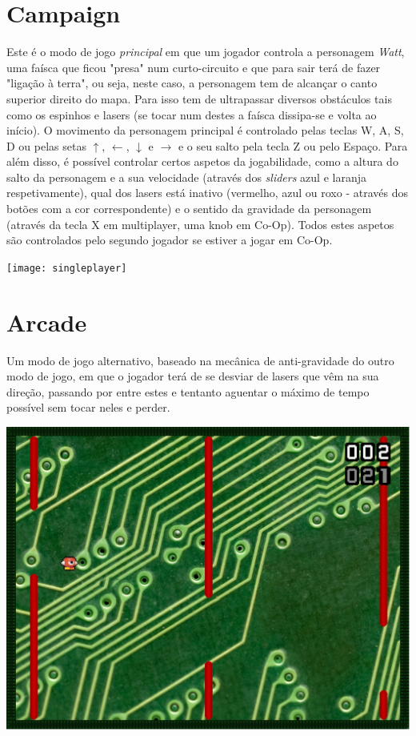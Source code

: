 \documentclass{report}
\begin{document}
\section{Campaign}

Este é o modo de jogo \textit{principal} em que um jogador controla a personagem \textit{Watt}, uma faísca que ficou "presa" num curto-circuito e que para sair terá de fazer "ligação à terra", ou seja, neste caso, a personagem tem de alcançar o canto superior direito do mapa. Para isso tem de ultrapassar diversos obstáculos tais como os espinhos e lasers (se tocar num destes a faísca dissipa-se e volta ao início). \newline
O movimento da personagem principal é controlado pelas teclas W, A, S, D ou pelas setas $\uparrow$, $\leftarrow$, $\downarrow$ e $\rightarrow$ e o seu salto pela tecla Z ou pelo Espaço.
Para além disso, é possível controlar certos aspetos da jogabilidade, como a altura do salto da personagem e a sua velocidade (através dos \textit{sliders} azul e laranja respetivamente), qual dos lasers está inativo (vermelho, azul ou roxo - através dos botões com a cor correspondente) e o sentido da gravidade da personagem (através da tecla X em multiplayer, uma knob em Co-Op). Todos estes aspetos são controlados pelo segundo jogador se estiver a jogar em Co-Op.

\texttt{[image: singleplayer]}

\section{Arcade}

Um modo de jogo alternativo, baseado na mecânica de anti-gravidade do outro modo de jogo, em que o jogador terá de se desviar de lasers que vêm na sua direção, passando por entre estes e tentanto aguentar o máximo de tempo possível sem tocar neles e perder.

\includegraphics[width=\textwidth]{arcade}
\end{document}
